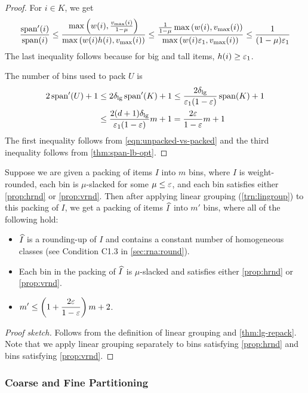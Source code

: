 \begin{proof}
For $i \in K$, we get
\begin{align*}
\frac{\operatorname{span}'(i)}{\operatorname{span}(i)}
\le \frac{\max\left(w(i), \frac{v_{\max}(i)}{1 - \mu}\right)}{
\max\left(w(i)h(i), v_{\max}(i)\right)}
\le \frac{\frac{1}{1-\mu}\max\left(w(i), v_{\max}(i)\right)}{
\max\left(w(i)\varepsilon_1, v_{\max}(i)\right)}
\le \frac{1}{(1-\mu)\varepsilon_1}
\end{align*}
The last inequality follows because for big and tall items, $h(i) \ge \varepsilon_1$.

The number of bins used to pack $U$ is
\begin{align*}
2\operatorname{span}'(U) + 1
&\le 2\delta_{\mathrm{lg}} \operatorname{span}'(K) + 1
\le \frac{2\delta_{\mathrm{lg}}}{\varepsilon_1(1-\varepsilon)} \operatorname{span}(K) + 1
\\ &\le \frac{2(d+1)\delta_{\mathrm{lg}}}{\varepsilon_1(1-\varepsilon)}m + 1
= \frac{2\varepsilon}{1-\varepsilon}m + 1
\end{align*}
The first inequality follows from \eqref{eqn:unpacked-vs-packed} and the third
inequality follows from \cref{thm:span-lb-opt}.
\end{proof}

\begin{lemma}
\label{lem:rnd2}
Suppose we are given a packing of items $I$ into $m$ bins,
where $I$ is weight-rounded, each bin is $\mu$-slacked for some $\mu \le \varepsilon$,
and each bin satisfies either \cref{prop:hrnd} or \cref{prop:vrnd}.
Then after applying linear grouping (\cref{trn:lingroup}) to this packing of $I$,
we get a packing of items $\widehat{I}$ into $m'$ bins, where all of the following hold:
\begin{itemize}
\item $\widehat{I}$ is a rounding-up of $I$ and contains a constant number of homogeneous classes
    (see Condition C1.3 in \cref{sec:rna:round}).
\item Each bin in the packing of $\widehat{I}$ is $\mu$-slacked
    and satisfies either \cref{prop:hrnd} or \cref{prop:vrnd}.
\item ${\displaystyle m' \le \left(1 + \frac{2\varepsilon}{1-\varepsilon}\right)m + 2}$.
\end{itemize}
\end{lemma}
\begin{proof}[Proof sketch]
Follows from the definition of linear grouping and \cref{thm:lg-repack}.
Note that we apply linear grouping separately to bins satisfying \cref{prop:hrnd}
and bins satisfying \cref{prop:vrnd}.
\end{proof}

\subsubsection{Coarse and Fine Partitioning}

